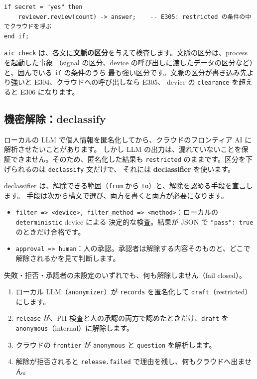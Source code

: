 \documentclass[a4paper,11pt]{ltjsarticle}
\begin{document}
\begin{lstlisting}[language=AWHDL]
if secret = "yes" then
    reviewer.review(count) -> answer;    -- E305: restricted の条件の中でクラウドを呼ぶ
end if;
\end{lstlisting}

\texttt{aic check} は、各文に\textbf{文脈の区分}を与えて検査します。文脈の区分は、process を起動した事象
（signal の区分、device の呼び出しに渡したデータの区分など）と、囲んでいる \texttt{if} の条件のうち
最も強い区分です。文脈の区分が書き込み先より強いと E304、クラウドへの呼び出しなら E305、
device の \texttt{clearance} を超えると E306 になります。

\subsection{機密解除：declassify}\label{sec:declassify}

ローカルの LLM で個人情報を匿名化してから、クラウドのフロンティア AI に解析させたいことがあります。
しかし LLM の出力は、漏れていないことを保証できません。そのため、匿名化した結果も
\texttt{restricted} のままです。区分を下げられるのは \texttt{declassify} 文だけで、
それには \textbf{declassifier} を使います。

declassifier は、解除できる範囲（\texttt{from} から \texttt{to}）と、解除を認める手段を宣言します。
手段は次から構文で選び、両方を書くと両方が必要になります。
\begin{itemize}
  \item \texttt{filter => <device>, filter\_method => <method>}：ローカルの \texttt{deterministic} device による
        決定的な検査。結果が JSON で \texttt{"pass": true} のときだけ合格です。
  \item \texttt{approval => human}：人の承認。承認者は解除する内容そのものと、どこで解除されるかを見て判断します。
\end{itemize}
失敗・拒否・承認者の未設定のいずれでも、何も解除しません（fail closed）。



\begin{enumerate}
  \item ローカル LLM（\texttt{anonymizer}）が \texttt{records} を匿名化して \texttt{draft}（restricted）にします。
  \item \texttt{release} が、PII 検査と人の承認の両方で認めたときだけ、\texttt{draft} を
        \texttt{anonymous}（internal）に解除します。
  \item クラウドの \texttt{frontier} が \texttt{anonymous} と \texttt{question} を解析します。
  \item 解除が拒否されると \texttt{release.failed} で理由を残し、何もクラウドへ出ません。
\end{enumerate}
\end{document}
